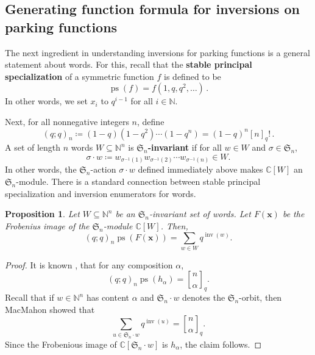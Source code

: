 \documentclass{amsart}
\newcommand{\N}{\mathbb{N}}
\renewcommand{\S}{\mathfrak{S}}
\newcommand{\CC}{\mathbb{C}}
\newcommand{\eqpd}{\, .}
\DeclareMathOperator{\inv}{inv}
\DeclareMathOperator{\ps}{ps}
\newcommand{\defterm}{\textbf}
\newcommand{\qbinom}[2]{\genfrac{[}{]}{0pt}{}{#1}{#2}}%
\newtheorem{proposition}[theorem]{Proposition}
\theoremstyle{definition}
\begin{document}
\subsection{Generating function formula for inversions on parking functions}
The next ingredient in understanding inversions for parking functions is a general statement about words. 
For this, recall that the \defterm{stable principal specialization} of a symmetric function $f$ is defined to be 
\[
\ps(f)=f(1,q,q^2,\dots)\eqpd
\]
 In other words, we set $x_i$ to $q^{i-1}$ for all $i\in \N$.

Next, for all nonnegative integers $n$, define 
\[(q;q)_n\coloneqq (1-q)(1-q^2)\cdots(1-q^n)=(1-q)^n[n]_q! \eqpd\]
 A set of length $n$ words $W\subseteq \N^n$ is \defterm{$\S_n$-invariant} if for all $w\in W$ and $\sigma\in \S_n$, 
\[\sigma\cdot w\coloneqq w_{\sigma^{-1}(1)}w_{\sigma^{-1}(2)}\cdots w_{\sigma^{-1}(n)}\in W.\]
In other words, the $\S_n$-action $\sigma\cdot w$ defined immediately above makes $\CC[W]$ an $\S_n$-module. There is a standard connection between stable principal specialization and inversion enumerators for words.
\begin{proposition}\label{lem:character-of-words-inversions}
    Let $W\subseteq \N^n$ be an $\S_n$-invariant set of words.
    Let $F(\mathbf{x})$ be the Frobenius image of the $\S_n$-module $\CC[W]$. Then, 
    \[(q;q)_n\ps(F(\mathbf{x}))=\sum_{w\in W}q^{\inv(w)}.\]
\end{proposition}

\begin{proof}
It is known \cite[Equation 9.4]{shareshian_chromatic_2016}, \cite[Lemma 5.2]{GESSEL1993189} that for any composition $\alpha$,
\[(q;q)_n\ps(h_\alpha)=\qbinom{n}{\alpha}_q.\]
Recall that if $w\in \N^n$ has content $\alpha$ 
and $\S_n\cdot w$ denotes the $\S_n$-orbit, then MacMahon \cite{MacMahon} showed that
    \begin{equation*}\sum_{u\in \S_n\cdot w}q^{\inv(u)}=\qbinom{n}{\alpha}_q.\end{equation*}
    Since the Frobenious image of $\CC[\S_n\cdot w]$ is $h_{\alpha}$, the claim follows.
\end{proof}
\end{document}
